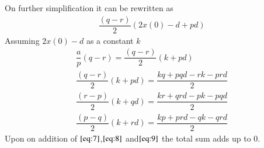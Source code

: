 \documentclass[journal,12pt,twocolumn]{IEEEtran}
\theoremstyle{remark}
\begin{document}
On further simplification it can be rewritten as 
\begin{align}
    \dfrac{(q-r)}{2}(2x(0)-d+pd)
\end{align}
Assuming $2x(0)-d$ as a constant $k$
\begin{align}
    \dfrac{a}{p}(q-r) = \dfrac{(q-r)}{2}(k+pd)\\
    \dfrac{(q-r)}{2}(k+pd) = \dfrac{kq+pqd-rk-prd}{2}\label{eq:7}\\
    \dfrac{(r-p)}{2}(k+qd) = \dfrac{kr+qrd-pk-pqd}{2}\label{eq:8}\\
    \dfrac{(p-q)}{2}(k+rd) = \dfrac{kp+prd-qk-qrd}{2}\label{eq:9}
\end{align}
Upon on addition of $ \eqref{eq:7}$,$ \eqref{eq:8}$ and$ \eqref{eq:9}$ the total sum adds up to 0.
\end{document}
